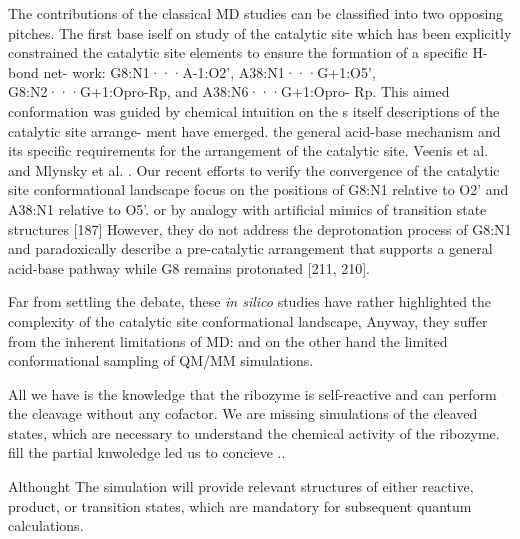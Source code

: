 \documentclass[journal=jacsat,manuscript=article]{achemso}
\begin{document}
The contributions of the classical MD studies can be classified into two opposing pitches.
The first base iself on study of the catalytic site which has been explicitly constrained the catalytic site elements to ensure the formation of a specific H-bond net-
work: G8:N1···A-1:O2’, A38:N1···G+1:O5’, G8:N2···G+1:Opro-Rp, and A38:N6···G+1:Opro-
Rp. 
This aimed conformation was guided by chemical intuition  on the s itself descriptions of the catalytic site arrange-
ment have emerged. the general acid-base mechanism and its specific
requirements for the arrangement of the catalytic site. Veenis et al. \cite{veenis_investigation_2021} and Mlynsky et al. \cite{mlynsky_reactive_2015}.
Our recent efforts to verify the convergence of the catalytic site conformational landscape%
focus on the positions of G8:N1 relative to O2’ and A38:N1 relative to O5’. 
or by analogy with artificial mimics of transition state structures [187] However, they do
not address the deprotonation process of G8:N1 and paradoxically describe a pre-catalytic
arrangement that supports a general acid-base pathway while G8 remains protonated [211,
210].

Far from settling the debate, these \textit{in silico} studies have rather highlighted the complexity of the catalytic site conformational landscape,
Anyway, they suffer from the inherent limitations of MD: 
and on the other hand the limited conformational sampling of QM/MM simulations.





All we have is the knowledge that the ribozyme is self-reactive and can perform the cleavage without any cofactor. We are missing simulations of the cleaved states, which are necessary to understand the chemical activity of the ribozyme.
fill the partial knwoledge led us to concieve ..

Althought 
The simulation will provide relevant structures of either reactive, product, or transition states,
which are mandatory for subsequent quantum calculations.
\end{document}
